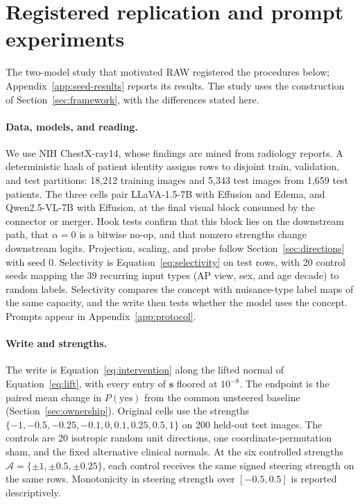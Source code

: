 \section{Registered replication and prompt experiments}
\label{app:seed}

The two-model study that motivated RAW registered the procedures below; Appendix~\ref{app:seed-results} reports its results. The study uses the construction of Section~\ref{sec:framework}, with the differences stated here.

\paragraph{Data, models, and reading.}
We use NIH ChestX-ray14\cite{wang2017chestxray}, whose findings are mined from radiology reports. A deterministic hash of patient identity assigns rows to disjoint train, validation, and test partitions: 18,212 training images and 5,343 test images from 1,659 test patients. The three cells pair LLaVA-1.5-7B\cite{liu2024improved} with Effusion and Edema, and Qwen2.5-VL-7B\cite{bai2025qwen25vl} with Effusion, at the final visual block consumed by the connector or merger. Hook tests confirm that this block lies on the downstream path, that $\alpha=0$ is a bitwise no-op, and that nonzero strengths change downstream logits. Projection, scaling, and probe follow Section~\ref{sec:directions} with seed 0. Selectivity is Equation~\ref{eq:selectivity} on test rows, with 20 control seeds mapping the 39 recurring input types (AP view, sex, and age decade) to random labels. Selectivity compares the concept with nuisance-type label maps of the same capacity, and the write then tests whether the model uses the concept. Prompts appear in Appendix~\ref{app:protocol}.

\paragraph{Write and strengths.}
The write is Equation~\ref{eq:intervention} along the lifted normal of Equation~\ref{eq:lift}, with every entry of $\boldsymbol s$ floored at $10^{-8}$. The endpoint is the paired mean change in $P(\mathrm{yes})$ from the common unsteered baseline (Section~\ref{sec:ownership}). Original cells use the strengths $\{-1,-0.5,-0.25,-0.1,0,0.1,0.25,0.5,1\}$ on 200 held-out test images. The controls are 20 isotropic random unit directions, one coordinate-permutation sham, and the fixed alternative clinical normals. At the six controlled strengths $\mathcal A=\{\pm1,\pm0.5,\pm0.25\}$, each control receives the same signed steering strength on the same rows. Monotonicity in steering strength over $[-0.5,0.5]$ is reported descriptively.

